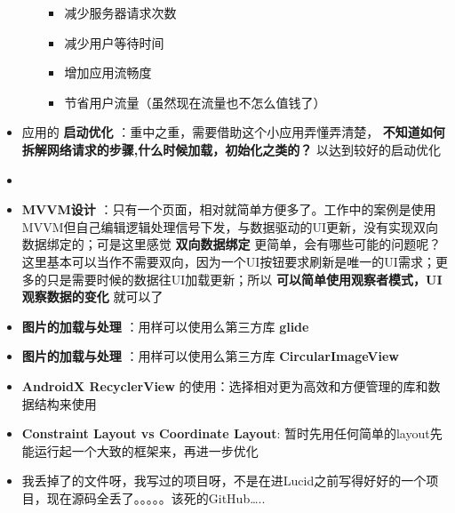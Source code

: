 \documentclass[9pt, b5paper]{article}
\begin{document}
\begin{itemize}
\begin{itemize}
\begin{itemize}
\item 减少服务器请求次数
\item 减少用户等待时间
\item 增加应用流畅度
\item 节省用户流量（虽然现在流量也不怎么值钱了）
\end{itemize}
\end{itemize}
\item 应用的 \textbf{启动优化} ：重中之重，需要借助这个小应用弄懂弄清楚， \textbf{不知道如何拆解网络请求的步骤,什么时候加载，初始化之类的？} 以达到较好的启动优化
\item 
\item \textbf{MVVM设计} ：只有一个页面，相对就简单方便多了。工作中的案例是使用MVVM但自己编辑逻辑处理信号下发，与数据驱动的UI更新，没有实现双向数据绑定的；可是这里感觉 \textbf{双向数据绑定} 更简单，会有哪些可能的问题呢？这里基本可以当作不需要双向，因为一个UI按钮要求刷新是唯一的UI需求；更多的只是需要时候的数据往UI加载更新；所以 \textbf{可以简单使用观察者模式，UI观察数据的变化} 就可以了
\item \textbf{图片的加载与处理} ：用样可以使用么第三方库 \textbf{glide}
\item \textbf{图片的加载与处理} ：用样可以使用么第三方库 \textbf{CircularImageView}
\item \textbf{AndroidX RecyclerView} 的使用：选择相对更为高效和方便管理的库和数据结构来使用
\item \textbf{Constraint Layout vs Coordinate Layout}: 暂时先用任何简单的layout先能运行起一个大致的框架来，再进一步优化
\item 我丢掉了的文件呀，我写过的项目呀，不是在进Lucid之前写得好好的一个项目，现在源码全丢了。。。。。该死的GitHub\ldots{}..
\end{itemize}
\end{document}

